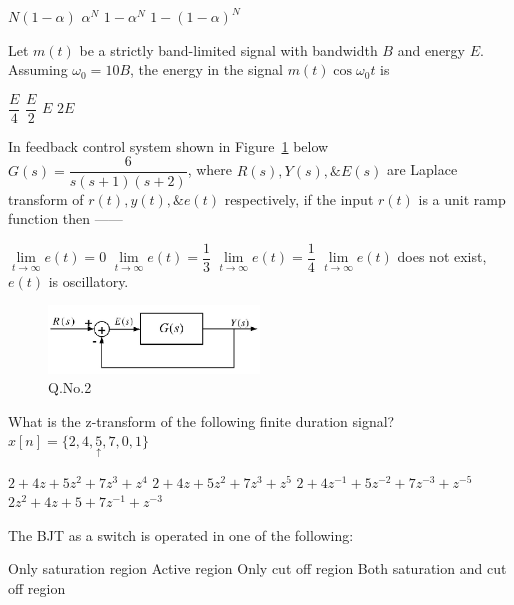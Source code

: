 \documentclass[a4, 12pt, addpoints]{exam}
\begin{document}
\begin{questions}
\begin{oneparchoices}
\choice $N(1-\alpha)$
\choice $\alpha^N$
\choice $1 - \alpha^N $
\choice $ 1- (1 - \alpha)^N$
\end{oneparchoices}     
\question Let $m(t)$ be a strictly band-limited signal with bandwidth $B$ and energy $E$. Assuming $\omega_0 = 10B$, the energy in the signal $m(t) \cos \omega_0 t$ is\\[0.3cm]
\begin{oneparchoices}
\choice $\dfrac{E}{4}$
\choice $\dfrac{E}{2}$
\choice $E$
\choice $2E$
\end{oneparchoices}  
\question In feedback control system shown in Figure~\ref{q2} below $ G(s) = \dfrac{6}{s(s+1)(s+2)} $, where $R(s), Y(s), \& E(s)$ are Laplace transform of $r(t), y(t), \& e(t) $ respectively, if the input $r(t)$ is a unit ramp function then ------  \\[0.3cm]
\begin{oneparchoices}
\choice $\lim \limits_{t \to \infty } e(t) = 0$
\choice $\lim \limits_{t \to \infty } e(t) = \dfrac{1}{3}$
\choice $\lim \limits_{t \to \infty } e(t) = \dfrac{1}{4}$
\choice $\lim \limits_{t \to \infty } e(t) $ does not exist, $e(t)$ is oscillatory.
\end{oneparchoices}
\begin{figure}[h!]
\centering
\includegraphics[width=0.5\textwidth]{fbc.png}
\caption{Q.No.2}
\label{q2}
\end{figure}  
\question What is the z-transform of the following finite duration signal? $ x[n] = \{ 2, 4, \underset{\uparrow}{5}, 7, 0, 1 \} $\\[0.3cm]
\begin{oneparchoices}
\choice $ 2 + 4z + 5z^2 + 7z^3 + z^4  $
\choice $2 + 4z + 5z^2 + 7z^3 + z^5$
\choice $ 2 + 4z^{-1} + 5z^{-2} + 7z^{-3} + z^{-5} $
\choice $ 2z^2 + 4z + 5 +7z^{-1} + z^{-3}$
\end{oneparchoices}  
\question The BJT as a switch is  operated in one of the following:
\begin{oneparchoices}
\choice Only saturation region
\choice Active region
\choice Only cut off region
\choice Both saturation and cut off region
\end{oneparchoices}  

\end{questions}
\end{document}
